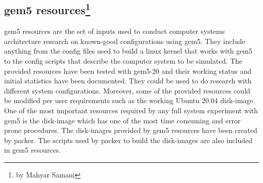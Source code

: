 \subsection[gem5 resources]{gem5 resources\footnote{by Mahyar Samani}}

gem5 resources are the set of inputs used to conduct computer systems architecture
research on known-good configurations using gem5. They include anything from the config
files used to build a linux kernel that works with gem5 to the config scripts that describe
the computer system to be simulated. The provided resources have been tested with gem5-20
and their working status and initial statistics have been documented. They could be used to
do research with different system configurations. Moreover, some of the provided resources
could be modified per user requirements such as the working Ubuntu 20.04 disk-image. One of
the most important resources required by any full system experiment with gem5 is the disk-image
which has one of the most time consuming and error prone procedures. The disk-images provided by
gem5 resources have been created by packer. The scripts used by packer to build the disk-images
are also included in gem5 resources.  
